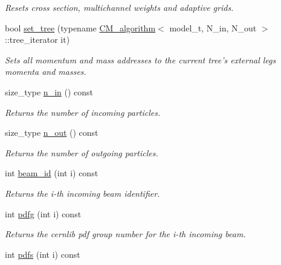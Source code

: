 \begin{DoxyCompactItemize}
\begin{DoxyCompactList}\small\item\em Resets cross section, multichannel weights and adaptive grids. \end{DoxyCompactList}\item 
bool \hyperlink{a00441_af3e00200b661698bf1e36495a816a3b6}{set\-\_\-tree} (typename \hyperlink{a00070}{C\-M\-\_\-algorithm}$<$ model\-\_\-t, N\-\_\-in, N\-\_\-out $>$\-::tree\-\_\-iterator it)
\begin{DoxyCompactList}\small\item\em Sets all momentum and mass addresses to the current tree's external legs momenta and masses. \end{DoxyCompactList}\item 
\hypertarget{a00441_a65d6bc1d66794e4681960e19706d17c3}{size\-\_\-type \hyperlink{a00441_a65d6bc1d66794e4681960e19706d17c3}{n\-\_\-in} () const }\label{a00441_a65d6bc1d66794e4681960e19706d17c3}

\begin{DoxyCompactList}\small\item\em Returns the number of incoming particles. \end{DoxyCompactList}\item 
\hypertarget{a00441_abc07b7563a01931e291a3a99296984ba}{size\-\_\-type \hyperlink{a00441_abc07b7563a01931e291a3a99296984ba}{n\-\_\-out} () const }\label{a00441_abc07b7563a01931e291a3a99296984ba}

\begin{DoxyCompactList}\small\item\em Returns the number of outgoing particles. \end{DoxyCompactList}\item 
\hypertarget{a00441_ae8b9e47a20834f1a3a136e157265b53f}{int \hyperlink{a00441_ae8b9e47a20834f1a3a136e157265b53f}{beam\-\_\-id} (int i) const }\label{a00441_ae8b9e47a20834f1a3a136e157265b53f}

\begin{DoxyCompactList}\small\item\em Returns the i-\/th incoming beam identifier. \end{DoxyCompactList}\item 
\hypertarget{a00441_ab963ccd0bcebc4a23a1c8458f4a12d9b}{int \hyperlink{a00441_ab963ccd0bcebc4a23a1c8458f4a12d9b}{pdfg} (int i) const }\label{a00441_ab963ccd0bcebc4a23a1c8458f4a12d9b}

\begin{DoxyCompactList}\small\item\em Returns the cernlib pdf group number for the i-\/th incoming beam. \end{DoxyCompactList}\item 
\hypertarget{a00441_a0ede4675a8a1b5f5cd579b81b34dfef7}{int \hyperlink{a00441_a0ede4675a8a1b5f5cd579b81b34dfef7}{pdfs} (int i) const }\label{a00441_a0ede4675a8a1b5f5cd579b81b34dfef7}


\end{DoxyCompactItemize}

